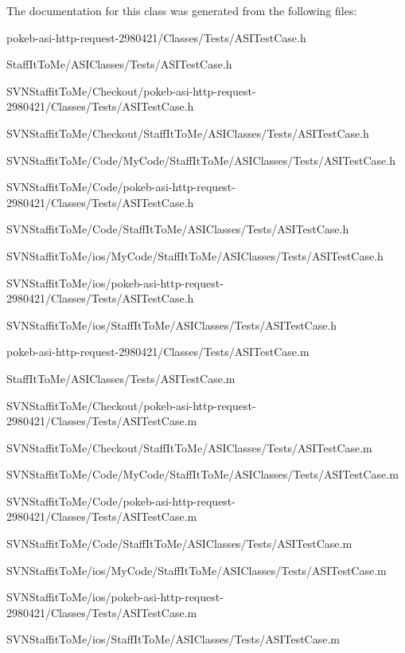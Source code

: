 \-The documentation for this class was generated from the following files\-:\begin{DoxyCompactItemize}
\item 
pokeb-\/asi-\/http-\/request-\/2980421/\-Classes/\-Tests/\-A\-S\-I\-Test\-Case.\-h\item 
\-Staff\-It\-To\-Me/\-A\-S\-I\-Classes/\-Tests/\-A\-S\-I\-Test\-Case.\-h\item 
\-S\-V\-N\-Staffit\-To\-Me/\-Checkout/pokeb-\/asi-\/http-\/request-\/2980421/\-Classes/\-Tests/\-A\-S\-I\-Test\-Case.\-h\item 
\-S\-V\-N\-Staffit\-To\-Me/\-Checkout/\-Staff\-It\-To\-Me/\-A\-S\-I\-Classes/\-Tests/\-A\-S\-I\-Test\-Case.\-h\item 
\-S\-V\-N\-Staffit\-To\-Me/\-Code/\-My\-Code/\-Staff\-It\-To\-Me/\-A\-S\-I\-Classes/\-Tests/\-A\-S\-I\-Test\-Case.\-h\item 
\-S\-V\-N\-Staffit\-To\-Me/\-Code/pokeb-\/asi-\/http-\/request-\/2980421/\-Classes/\-Tests/\-A\-S\-I\-Test\-Case.\-h\item 
\-S\-V\-N\-Staffit\-To\-Me/\-Code/\-Staff\-It\-To\-Me/\-A\-S\-I\-Classes/\-Tests/\-A\-S\-I\-Test\-Case.\-h\item 
\-S\-V\-N\-Staffit\-To\-Me/ios/\-My\-Code/\-Staff\-It\-To\-Me/\-A\-S\-I\-Classes/\-Tests/\-A\-S\-I\-Test\-Case.\-h\item 
\-S\-V\-N\-Staffit\-To\-Me/ios/pokeb-\/asi-\/http-\/request-\/2980421/\-Classes/\-Tests/\-A\-S\-I\-Test\-Case.\-h\item 
\-S\-V\-N\-Staffit\-To\-Me/ios/\-Staff\-It\-To\-Me/\-A\-S\-I\-Classes/\-Tests/\-A\-S\-I\-Test\-Case.\-h\item 
pokeb-\/asi-\/http-\/request-\/2980421/\-Classes/\-Tests/\-A\-S\-I\-Test\-Case.\-m\item 
\-Staff\-It\-To\-Me/\-A\-S\-I\-Classes/\-Tests/\-A\-S\-I\-Test\-Case.\-m\item 
\-S\-V\-N\-Staffit\-To\-Me/\-Checkout/pokeb-\/asi-\/http-\/request-\/2980421/\-Classes/\-Tests/\-A\-S\-I\-Test\-Case.\-m\item 
\-S\-V\-N\-Staffit\-To\-Me/\-Checkout/\-Staff\-It\-To\-Me/\-A\-S\-I\-Classes/\-Tests/\-A\-S\-I\-Test\-Case.\-m\item 
\-S\-V\-N\-Staffit\-To\-Me/\-Code/\-My\-Code/\-Staff\-It\-To\-Me/\-A\-S\-I\-Classes/\-Tests/\-A\-S\-I\-Test\-Case.\-m\item 
\-S\-V\-N\-Staffit\-To\-Me/\-Code/pokeb-\/asi-\/http-\/request-\/2980421/\-Classes/\-Tests/\-A\-S\-I\-Test\-Case.\-m\item 
\-S\-V\-N\-Staffit\-To\-Me/\-Code/\-Staff\-It\-To\-Me/\-A\-S\-I\-Classes/\-Tests/\-A\-S\-I\-Test\-Case.\-m\item 
\-S\-V\-N\-Staffit\-To\-Me/ios/\-My\-Code/\-Staff\-It\-To\-Me/\-A\-S\-I\-Classes/\-Tests/\-A\-S\-I\-Test\-Case.\-m\item 
\-S\-V\-N\-Staffit\-To\-Me/ios/pokeb-\/asi-\/http-\/request-\/2980421/\-Classes/\-Tests/\-A\-S\-I\-Test\-Case.\-m\item 
\-S\-V\-N\-Staffit\-To\-Me/ios/\-Staff\-It\-To\-Me/\-A\-S\-I\-Classes/\-Tests/\-A\-S\-I\-Test\-Case.\-m\end{DoxyCompactItemize}
